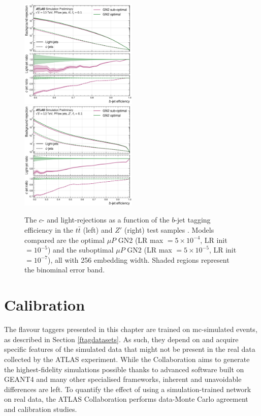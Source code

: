\begin{center}
  \begin{figure}[h!]
  \centerline{
  \includegraphics[width=0.50\textwidth]{Images/FTAG/GN/HPO/thesis_roc/roc_ttbar.png}
  \includegraphics[width=0.50\textwidth]{Images/FTAG/GN/HPO/thesis_roc/roc_zp.png}
  }
  \caption{The $c$- and light-rejections as a function of the $b$-jet tagging efficiency in the $t\bar{t}$ (left) and $Z'$ (right) test samples \cite{publicplotMUP}. Models compared are the optimal $\mu P$ GN2 (LR max $= 5\times 10^{-4}$, LR init $= 10^{-5}$) and the suboptimal $\mu P$ GN2 (LR max $= 5 \times 10^{-5}$, LR init $= 10^{-7}$), all with 256 embedding width. Shaded regions represent the binominal error band.}
  \label{fig:rocmupGN2}
  \end{figure}
\end{center}

\vspace{-1.5cm}
\section{Calibration}\label{chap-calibration}
The flavour taggers presented in this chapter are trained on \gls{mc}-simulated events, as described in Section \ref{ftagdatasets}. As such, they depend on and acquire specific features of the simulated data that might not be present in the real data collected by the ATLAS experiment. While the Collaboration aims to generate the highest-fidelity simulations possible thanks to advanced software built on GEANT4 \cite{Agostinelli:602040} and many other specialised frameworks, inherent and unavoidable differences are left. To quantify the effect of using a simulation-trained network on real data, the ATLAS Collaboration performs data-Monte Carlo agreement and calibration studies. \\

